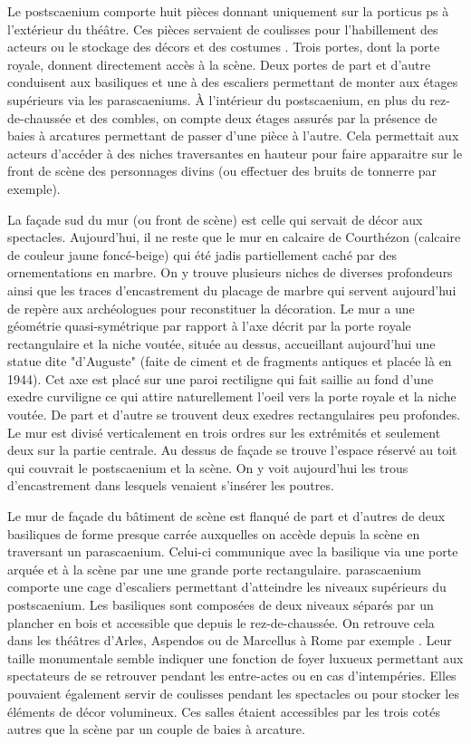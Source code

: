 		Le \gls{postscaenium} comporte huit pièces donnant uniquement sur la \gls{porticus ps} à l'extérieur du théâtre. Ces pièces servaient de coulisses pour l'habillement des acteurs ou le stockage des décors et des costumes \cite[p. 56]{formige}. Trois portes, dont la porte royale, donnent directement accès à la scène. Deux portes de part et d'autre conduisent aux \glspl{basilique} et une à des escaliers permettant de monter aux étages supérieurs via les \glspl{parascaenium}. \`{A} l'intérieur du \gls{postscaenium}, en plus du rez-de-chaussée et des combles, on compte deux étages assurés par la présence de baies à arcatures permettant de passer d'une pièce à l'autre. Cela permettait aux acteurs d'accéder à des niches traversantes en hauteur pour faire apparaitre sur le front de scène des personnages divins (ou effectuer des bruits de tonnerre par exemple).
		
		La façade sud du mur (ou front de scène) est celle qui servait de décor aux spectacles. Aujourd'hui, il ne reste que le mur en calcaire de Courthézon (calcaire de couleur jaune foncé-beige) qui été jadis partiellement caché par des ornementations en marbre. On y trouve plusieurs niches de diverses profondeurs ainsi que les traces d'encastrement du placage de marbre qui servent aujourd'hui de repère aux archéologues pour reconstituer la décoration. Le mur a une géométrie quasi-symétrique par rapport à l'axe décrit par la porte royale rectangulaire et la niche voutée, située au dessus, accueillant aujourd'hui une statue dite "d'Auguste" (faite de ciment et de fragments antiques et placée là en 1944). Cet axe est placé sur une paroi rectiligne qui fait saillie au fond d'une \gls{exedre} curviligne ce qui attire naturellement l'oeil vers la porte royale et la niche voutée. De part et d'autre se trouvent deux \glspl{exedre} rectangulaires peu profondes. Le mur est divisé verticalement en trois ordres sur les extrémités et seulement deux sur la partie centrale. Au dessus de façade se trouve l'espace réservé au toit qui couvrait le \gls{postscaenium} et la scène. On y voit aujourd'hui les trous d'encastrement dans lesquels venaient s'insérer les poutres.
		
		Le mur de façade du bâtiment de scène est flanqué de part et d'autres de deux \glspl{basilique} de forme presque carrée auxquelles on accède depuis la scène en traversant un \gls{parascaenium}. Celui-ci communique avec la basilique via une porte arquée et à la scène par une une grande porte rectangulaire. \gls{parascaenium} comporte une cage d'escaliers permettant d'atteindre les niveaux supérieurs du \gls{postscaenium}. Les \glspl{basilique} sont composées de deux niveaux séparés par un plancher en bois et accessible que depuis le rez-de-chaussée. On retrouve cela dans les théâtres d'Arles, Aspendos ou de Marcellus à Rome par exemple \cite[p. 35]{formige}. Leur taille monumentale semble indiquer une fonction de foyer luxueux permettant aux spectateurs de se retrouver pendant les entre-actes ou en cas d'intempéries. Elles pouvaient également servir de coulisses pendant les spectacles ou pour stocker les éléments de décor volumineux. Ces salles étaient accessibles par les trois cotés autres que la scène par un couple de baies à arcature. 
				
